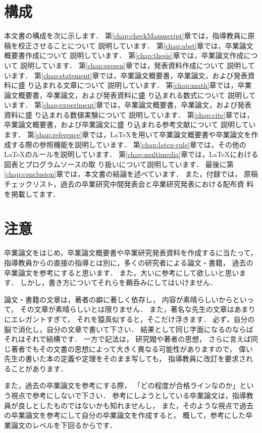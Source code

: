 \documentclass[a4j,12pt,dvipdfmx,oneside]{jsbook}
\theoremstyle{definition}
\begin{document}
\section{構成}\label{sec:contents}
%
%
%
本文書の構成を次に示します．
第\ref{chap:checkManuscript}章では，指導教員に原稿を校正させることについて
説明しています．
第\ref{chap:abst}章では，卒業論文概要書作成について
説明しています．
第\ref{chap:thesis}章では，卒業論文作成について
説明しています．
第\ref{chap:presen}章では，発表資料作成について
説明しています．
第\ref{chap:statement}章では，卒業論文概要書，卒業論文，および発表資料に盛
り込まれる文章について
説明しています．
第\ref{chap:math}章では，卒業論文概要書，卒業論文，および発表資料に盛
り込まれる数式について
説明しています．
第\ref{chap:experiment}章では，卒業論文概要書，卒業論文，および発表資料に盛
り込まれる数値実験について
説明しています．
第\ref{chap:cite}章では，卒業論文概要書，および卒業論文に盛
り込まれる参考文献について
説明しています．
第\ref{chap:reference}章では，\LaTeX{}を用いて卒業論文概要書や卒業論文を作
成する際の参照機能を説明しています．
第\ref{chap:latex-rule}章では，その他の\LaTeX{}のルールを説明しています．
第\ref{chap:multimedia}章では，\LaTeX{}における図表とプログラムソースの取
り扱いについて説明しています．
最後に第\ref{chap:conclusion}章では，本文書の結論を述べています．
また，付録では，
原稿チェックリスト，過去の卒業研究中間発表会と卒業研究発表における配布資
料を掲載してます．
%
%
%
\section{注意}
卒業論文をはじめ，卒業論文概要書や卒業研究発表資料を作成するに当たって，
指導教員からの直接の指導とは別に，多くの研究者による論文・書籍，
過去の卒業論文を参考にすると思います．
また，大いに参考にして欲しいと思います．
しかし，書き方についてそれらを鵜呑みにしてはいけません．

論文・書籍の文章は，著者の癖に著しく依存し，
内容が素晴らしいからといって，
その文章が素晴らしいとは限りません．
また，著名な先生の文章はあまりにエレガントすぎて，
それを猿真似すると，そこだけ浮きます．
必ず，自分の脳で消化し，自分の文章で書いて下さい．
結果として同じ字面になるのならばそれはそれで結構です．
一方で記法は，
研究閥や著者の思想，
さらに言えば同じ著者でもその文書の思想によって大きく異なる可能性がありますので，
偉い先生の書いた本の定義や定理をそのまま写しても，
指導教員に改訂を要求されることがあります．

また，過去の卒業論文を参考にする際，
「どの程度が合格ラインなのか」という視点で参考にしないで下さい．
参考にしようとしている卒業論文は，指導教員が良しとしたものではないかも知れませんし，
また，そのような視点で過去の卒業論文を参考にして自分の卒業論文を作成すると，
概して，参考にした卒業論文のレベルを下回るからです．
%
%
%
\end{document}
